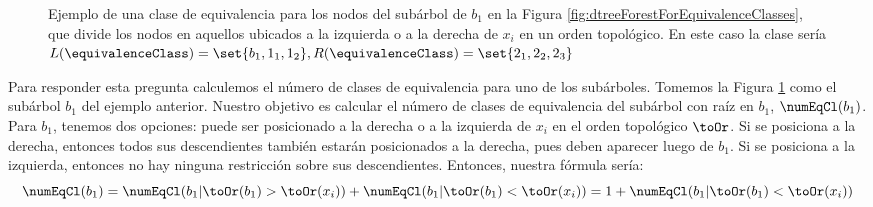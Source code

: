 
\begin{figure}[ht]
\centering 
    \caption{Ejemplo de una clase de equivalencia para los nodos del subárbol de $b_1$ en la Figura \ref{fig:dtreeForestForEquivalenceClasses}, que divide los nodos en aquellos ubicados a la izquierda o a la derecha de $x_i$ en un orden topológico. En este caso la clase sería $L(\equivalenceClass) = \set{b_1, 1_1, 1_2}, R(\equivalenceClass) = \set{2_1, 2_2, 2_3}$}
    \label{fig:unrelatedSubtree}
\end{figure}


Para responder esta pregunta calculemos el número de clases de equivalencia para uno de los subárboles. Tomemos la Figura \ref{fig:unrelatedSubtree} como el subárbol $b_1$ del ejemplo anterior. Nuestro objetivo es calcular el número de clases de equivalencia del subárbol con raíz en $b_1$, $\numEqCl(b_1)$. Para $b_1$, tenemos dos opciones: puede ser posicionado a la derecha o a la izquierda de $x_i$ en el orden topológico $\toOr$. Si se posiciona a la derecha, entonces todos sus descendientes también estarán posicionados a la derecha, pues deben aparecer luego de $b_1$. Si se posiciona a la izquierda, entonces no hay ninguna restricción sobre sus descendientes. Entonces, nuestra fórmula sería:
$$\numEqCl(b_1) = \numEqCl(b_1 | \toOr(b_1) > \toOr(x_i) ) +  \numEqCl(b_1 | \toOr(b_1) < \toOr(x_i) )  = 1 + \numEqCl(b_1 | \toOr(b_1) < \toOr(x_i) ) $$

